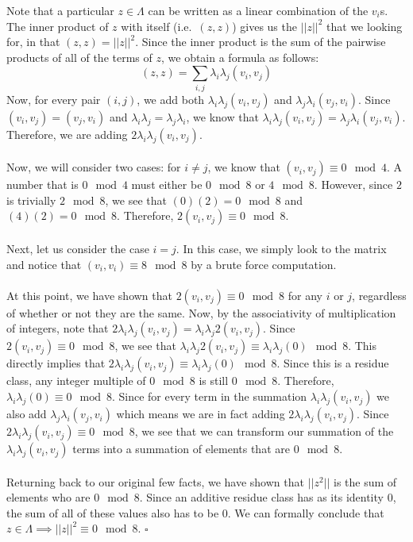 \documentclass[letterpaper]{article}
\newcommand*{\QED}{\hfill\ensuremath{\square}}%
\begin{document}
Note that a particular $ z \in \Lambda $ can be written as a linear combination of the $ v_i $s.
The inner product of $ z $ with itself (i.e.\ $ (z, z) $) gives us the $ ||z||^2 $ that we looking for, in that $ (z, z) = ||z||^2 $.
Since the inner product is the sum of the pairwise products of all of the terms of $ z $, we obtain a formula as follows:
$$ (z, z) = \sum_{i, j} \lambda_i \lambda_j (v_i, v_j) $$
Now, for every pair $ (i, j) $, we add both $ \lambda_i \lambda_j (v_i, v_j) $ and $ \lambda_j \lambda_i (v_j, v_i) $.
Since $ (v_i, v_j) = (v_j, v_i) $ and $ \lambda_i \lambda_j = \lambda_j \lambda_i $, we know that $ \lambda_i \lambda_j (v_i, v_j) = \lambda_j \lambda_i (v_j, v_i) $.
Therefore, we are adding $ 2 \lambda_i \lambda_j (v_i, v_j) $.
\\ \\
Now, we will consider two cases:
for $ i \neq j $, we know that $ (v_i, v_j) \equiv 0 \mod{4} $.
A number that is $ 0 \mod{4} $ must either be $ 0 \mod{8} $ or $ 4 \mod{8} $.
However, since $ 2 $ is trivially $ 2 \mod{8} $, we see that $ (0)(2) = 0 \mod{8} $ and $ (4)(2) = 0 \mod{8} $.
Therefore, $ 2 (v_i, v_j) \equiv 0 \mod{8} $.
\\ \\
Next, let us consider the case $ i = j $.
In this case, we simply look to the matrix and notice that $ (v_i, v_i) \equiv 8 \mod{8} $ by a brute force computation.
\\ \\
At this point, we have shown that $ 2 (v_i, v_j) \equiv 0 \mod{8} $ for any $ i $ or $ j $, regardless of whether or not they are the same.
Now, by the associativity of multiplication of integers, note that $ 2 \lambda_i \lambda_j (v_i, v_j) = \lambda_i \lambda_j 2 (v_i, v_j) $.
Since $ 2 (v_i, v_j) \equiv 0 \mod{8} $, we see that $ \lambda_i \lambda_j 2 (v_i, v_j) \equiv \lambda_i \lambda_j (0) \mod{8} $.
This directly implies that $ 2 \lambda_i \lambda_j (v_i, v_j) \equiv \lambda_i \lambda_j (0) \mod{8} $.
Since this is a residue class, any integer multiple of $ 0 \mod{8} $ is still $ 0 \mod{8} $.
Therefore, $ \lambda_i \lambda_j (0) \equiv 0 \mod{8} $.
Since for every term in the summation $ \lambda_i \lambda_j (v_i, v_j) $ we also add $ \lambda_j \lambda_i (v_j, v_i) $ which means we are in fact adding $ 2 \lambda_i \lambda_j (v_i, v_j) $.
Since $ 2 \lambda_i \lambda_j (v_i, v_j) \equiv 0 \mod{8} $, we see that we can transform our summation of the $ \lambda_i \lambda_j (v_i, v_j) $ terms into a summation of elements that are $ 0 \mod{8} $.
\\ \\
Returning back to our original few facts, we have shown that $ ||z^2|| $ is the sum of elements who are $ 0 \mod{8} $.
Since an additive residue class has as its identity $ 0 $, the sum of all of these values also has to be $ 0 $.
We can formally conclude that $ z \in \Lambda \implies ||z||^2 \equiv 0 \mod{8} $.
\QED{}
\end{document}
